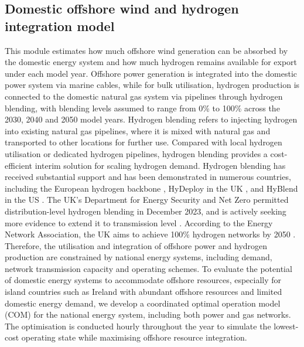\documentclass[pdflatex,sn-mathphys,Numbered]{sn-jnl}%
\begin{document}
\subsection{Domestic offshore wind and hydrogen integration model}

This module estimates how much offshore wind generation can be absorbed by the domestic energy system and how much hydrogen remains available for export under each model year.
Offshore power generation is integrated into the domestic power system via marine cables, while for bulk utilisation, hydrogen production is connected to the domestic natural gas system via pipelines through hydrogen blending, with blending levels assumed to range from 0\% to 100\% across the 2030, 2040 and 2050 model years. Hydrogen blending refers to injecting hydrogen into existing natural gas pipelines, where it is mixed with natural gas and transported to other locations for further use. Compared with local hydrogen utilisation or dedicated hydrogen pipelines, hydrogen blending provides a cost-efficient interim solution for scaling hydrogen demand. Hydrogen blending has received substantial support and has been demonstrated in numerous countries, including the European hydrogen backbone \cite{EuropeanHydrogenBackbone}, HyDeploy in the UK \cite{HyDeploy}, and HyBlend in the US \cite{HyBlend}. The UK's Department for Energy Security and Net Zero permitted distribution-level hydrogen blending in December 2023, and is actively seeking more evidence to extend it to transmission level \cite{HydrogenblendinginGB}. According to the Energy Network Association, the UK aims to achieve 100\% hydrogen networks by 2050 \cite{BritainsHydrogen}.
Therefore, the utilisation and integration of offshore power and hydrogen production are constrained by national energy systems, including demand, network transmission capacity and operating schemes. To evaluate the potential of domestic energy systems to accommodate offshore resources, especially for island countries such as Ireland with abundant offshore resources and limited domestic energy demand, we develop a coordinated optimal operation model (COM) for the national energy system, including both power and gas networks. The optimisation is conducted hourly throughout the year to simulate the lowest-cost operating state while maximising offshore resource integration.
\end{document}
